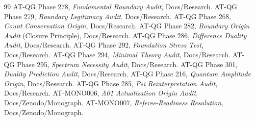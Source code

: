 \begin{thebibliography}{99}
 AT-QG Phase 278, \emph{Fundamental Boundary Audit}, Docs/Research.
 AT-QG Phase 279, \emph{Boundary Legitimacy Audit}, Docs/Research.
 AT-QG Phase 268, \emph{Count Conservation Origin}, Docs/Research.
 AT-QG Phase 282, \emph{Boundary Origin Audit} (Closure Principle), Docs/Research.
 AT-QG Phase 286, \emph{Difference Duality Audit}, Docs/Research.
 AT-QG Phase 292, \emph{Foundation Stress Test}, Docs/Research.
 AT-QG Phase 294, \emph{Minimal Theory Audit}, Docs/Research.
 AT-QG Phase 295, \emph{Spectrum Necessity Audit}, Docs/Research.
 AT-QG Phase 301, \emph{Duality Prediction Audit}, Docs/Research.
 AT-QG Phase 216, \emph{Quantum Amplitude Origin}, Docs/Research.
 AT-QG Phase 285, \emph{Psi Reinterpretation Audit}, Docs/Research.
 AT-MONO006, \emph{A01 Actualization Origin Audit}, Docs/Zenodo/Monograph.
 AT-MONO007, \emph{Referee-Readiness Resolution}, Docs/Zenodo/Monograph.
\end{thebibliography}
